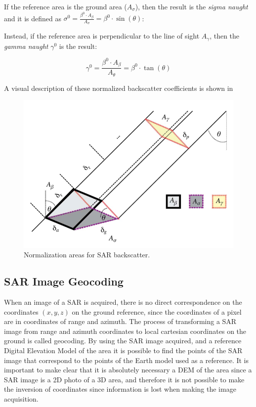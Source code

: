 If the reference area is the ground area ($A_\sigma$), then the result is the \textit{sigma naught} and it is defined as $\sigma^0 = \frac{\beta^0 \cdot A_\beta}{A_\sigma} = \beta^0 \cdot \sin(\theta)$:


Instead, if the reference area is perpendicular to the line of sight $A_\gamma$, then the \textit{gamma naught} $\gamma^0$ is the result:

\begin{equation}
    \gamma^0 = \frac{\beta^0 \cdot A_\beta}{A_\theta} = \beta^0 \cdot \tan(\theta)
\end{equation}{}

A visual description of these normalized backscatter coefficients is shown in 

\begin{figure}[H]
    \centering
    \includegraphics[width=0.8\linewidth]{Cap1/retang.png}
    \caption{Normalization areas for SAR backscatter. \cite{Small}}
    \label{fig:normalization_areas}
\end{figure}


\subsection{SAR Image Geocoding}
\label{sec:sar_geocoding}

When an image of a SAR is acquired, there is no direct correspondence on the coordinates $(x,y,z)$ on the ground reference, since the coordinates of a pixel are in coordinates of range and azimuth. The process of transforming a SAR image from range and azimuth coordinates to local cartesian coordinates on the ground is called geocoding. By using the SAR image acquired, and a reference Digital Elevation Model of the area it is possible to find the points of the SAR image that correspond to the points of the Earth model used as a reference. It is important to make clear that it is absolutely necessary a DEM of the area since a SAR image is a 2D photo of a 3D area, and therefore it is not possible to make the inversion of coordinates since information is lost when making the image acquisition.

